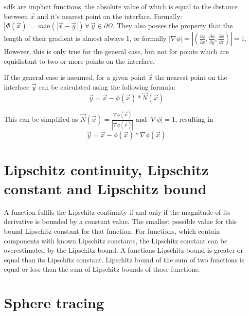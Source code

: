 \Glspl{sdf} are implicit functions, the absolute value of which is equal to the distance between $\vec{x}$ and it's nearest point on the interface. Formally:  $|\Phi(\vec{x})| = min(|\vec{x} - \vec{y}|) \, \forall \, \vec{y} \in \partial\Omega$. They also posses the property that the length of their gradient is almost always 1, or formally  $|\nabla\phi| = |(\frac{\partial\phi}{\partial x},\frac{\partial\phi}{\partial y},\frac{\partial\phi}{\partial z})| = 1$. However, this is only true for the general case, but not for points which are equidistant to two or more points on the interface.

If the general case is assumed, for a given point $\vec{x}$ the nearest point on the interface $\vec{y}$ can be calculated using the following formula:
$$\vec{y} = \vec{x} - \phi(\vec{x}) * \vec{N}(\vec{x}) $$

This can be simplified as  $\vec{N}(\vec{x}) = \frac{\nabla\phi(\vec{x})}{|\nabla\phi(\vec{x})|}$ and $|\nabla\phi| = 1$, resulting in 
$$\vec{y} = \vec{x} - \phi(\vec{x}) * \nabla\phi(\vec{x}) $$

\section{Lipschitz continuity, Lipschitz constant and Lipschitz bound}
A function fulfils the Lipschitz continuity if and only if the magnitude of its derivative is bounded by a constant value. The smallest possible value for this bound Lipschitz constant for that function. For functions, which contain components with known Lipschitz constants, the Lipschitz constant can be overestimated by the Lipschitz bound. A functions Lipschitz bound is greater or equal than its Lipschitz constant. Lipschitz bound of the sum of two functions is equal or less than the sum of Lipschitz bounds of those functions. 
\cite{hart:1996:sphere}\cite{Heuser:2003}

\section{Sphere tracing}
\cite{hart:1996:sphere}








